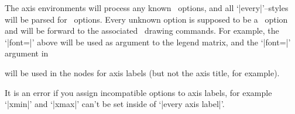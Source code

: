 The axis environments will process any known \PGFPlots\ options, and all `|every|'--styles will be parsed for \PGFPlots\ options. Every unknown option is supposed to be a \Tikz\ option and will be forward to the associated \Tikz\ drawing commands. For example, the `|font=\Large|' above will be used as argument to the legend matrix, and the `|font=\Large|' argument in 
\begin{codeexample}
\end{codeexample}
will be used in the nodes for axis labels (but not the axis title, for example).

It is an error if you assign incompatible options to axis labels, for example `|xmin|' and `|xmax|' can't be set inside of `|every axis label|'.
